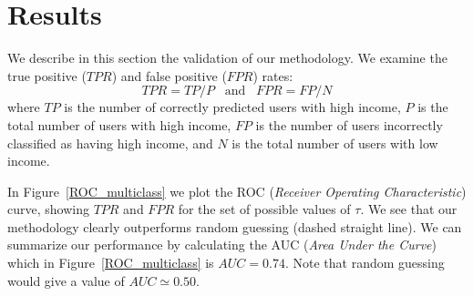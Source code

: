 \section{Results}





We describe in this section the validation of our methodology. 
We examine the true positive ($TPR$) and false positive ($FPR$) rates: 
\[
	TPR=TP/P \enspace \text{ and } \enspace FPR=FP/N
\]
where $TP$ is the number of correctly predicted users with high income, $P$ is the total number of users with high income, $FP$ is the number of users incorrectly classified as having high income, and $N$ is the total number of users with low income. 

In Figure~\ref{ROC_multiclass} we plot the ROC (\textit{Receiver Operating Characteristic}) curve, showing $TPR$ and $FPR$ for the set of possible values of $\tau$. We see that our methodology clearly outperforms random guessing (dashed straight line). We can summarize our performance by calculating  the AUC (\textit{Area Under the Curve}) which in Figure~\ref{ROC_multiclass} is $AUC = 0.74$. Note that random guessing would give a value of $AUC \simeq 0.50$.


%

